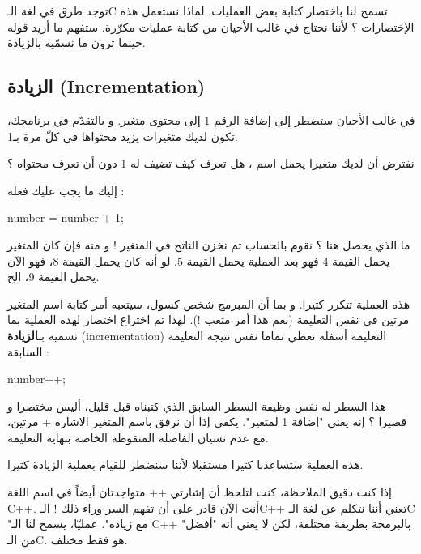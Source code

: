 توجد طرق في لغة الـ\textenglish{C}
تسمح لنا باختصار كتابة بعض العمليات. لماذا نستعمل هذه الإختصارات ؟ لأننا نحتاج في غالب الأحيان من كتابة عمليات مكرّرة. ستفهم ما أريد قوله حينما ترون ما نسمّيه بالزيادة.

\subsection{الزيادة (\textenglish{Incrementation})}

في غالب الأحيان ستضطر إلى إضافة الرقم 1 إلى محتوى متغير. و بالتقدّم في برنامجك، تكون لديك متغيرات يزيد محتواها في كلّ مرة بـ1.

نفترض أن لديك متغيرا يحمل اسم
،
هل تعرف كيف تضيف له 1 دون أن تعرف محتواه ؟

إليك ما يجب عليك فعله :

\begin{Csource}
number = number + 1;
\end{Csource}

ما الذي يحصل هنا ؟ نقوم بالحساب
ثم نخزن الناتج في المتغير
 !
و منه فإن كان المتغير يحمل القيمة 4 فهو بعد العملية يحمل القيمة 5. لو أنه كان يحمل القيمة 8، فهو الآن يحمل القيمة 9، الخ.

هذه العملية تتكرر كثيرا. و بما أن المبرمج شخص كسول، سيتعبه أمر كتابة اسم المتغير مرتين في نفس التعليمة (نعم هذا أمر متعب !). لهذا تم اختراع اختصار لهذه العملية بما نسميه بـ\textbf{الزيادة }
(\textenglish{incrementation})
التعليمة أسفله تعطي تماما نفس نتيجة التعليمة السابقة :

\begin{Csource}
  number++;
\end{Csource}

هذا السطر له نفس وظيفة السطر السابق الذي كتبناه قبل قليل، أليس مختصرا و قصيرا ؟ إنه يعني "إضافة 1 لمتغير". يكفي إذا أن نرفق باسم المتغير
الاشارة + مرتين، مع عدم نسيان الفاصلة المنقوطة الخاصة بنهاية التعليمة.

هذه العملية ستساعدنا كثيرا مستقبلا لأننا سنضطر للقيام بعملية الزيادة كثيرا.

\begin{information}
إذا كنت دقيق الملاحظة، كنت لتلحظ أن إشارتي
++
متواجدتان أيضاً في اسم اللغة
\textenglish{C++}.
أنت الآن قادر على أن تفهم السر وراء ذلك ! الـ\textenglish{C++}
تعني أننا نتكلم عن لغة الـ\textenglish{C}
"مع زيادة". عمليّا، يسمح لنا الـ
\textenglish{C++}
بالبرمجة بطريقة مختلفة، لكن لا يعني أنه "أفضل" من الـ\textenglish{C}.
هو فقط مختلف.
\end{information}


